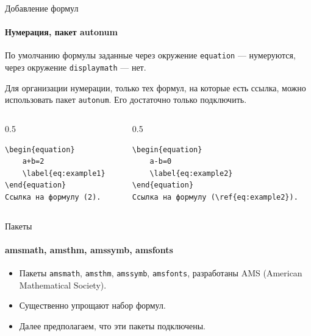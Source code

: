 \documentclass[10pt,aspectratio=169]{beamer}
\begin{document}
    \begin{frame}[fragile]{Добавление формул}
    	\framesubtitle{Нумерация, пакет autonum}
    	По умолчанию формулы заданные через окружение \verb|equation| --- нумеруются, через окружение \verb|displaymath| --- нет.
    	
    	Для организации нумерации, только тех формул, на которые есть ссылка, можно использовать пакет  \verb|autonum|. Его достаточно только подключить.
    	
    	\begin{columns}
    		\begin{column}{0.5\textwidth}
\begin{lstlisting}
\begin{equation}
	a+b=2
	\label{eq:example1}
\end{equation}
Ссылка на формулу (2).
\end{lstlisting}
    		\end{column}
    		\begin{column}{0.5\textwidth}
\begin{lstlisting}
\begin{equation}
	a-b=0
	\label{eq:example2}
\end{equation}
Ссылка на формулу (\ref{eq:example2}).
\end{lstlisting}
    		\end{column}
    	\end{columns}
    \end{frame}
    
    \begin{frame}[fragile]{Пакеты}
       	\framesubtitle{amsmath, amsthm, amssymb, amsfonts}
       	
       	\begin{itemize}
    		\item Пакеты \verb|amsmath|, \verb|amsthm|, \verb|amssymb|, \verb|amsfonts|, разработаны AMS (American Mathematical Society).
    		\item Существенно упрощают набор формул.
    		\item Далее предполагаем, что эти пакеты подключены.
    	\end{itemize}
    \end{frame}
    
\end{document}
